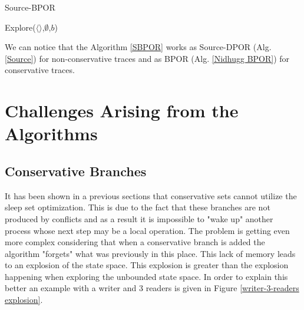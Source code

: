 \begin{algorithm}
    \caption{Source-BPOR}
    \label{SBPOR}
    Explore($\langle \rangle$,$\emptyset$,$b$)\;
\end{algorithm}

We can notice that the Algorithm \ref{SBPOR} works as Source-DPOR (Alg. \ref{Source}) for non-conservative traces and as BPOR (Alg. \ref{Nidhugg BPOR}) for conservative traces.

\section{Challenges Arising from the Algorithms}

\subsection{Conservative Branches}
It has been shown in a previous sections that conservative sets cannot utilize the sleep set optimization. This is due to the fact that these branches are not produced by conflicts
and as a result it is impossible to "wake up" another process whose next step may be a local operation. The problem is getting even more complex considering that when a conservative branch
is added the algorithm "forgets" what was previously in this place. This lack of memory leads to an explosion of the state space. This explosion is greater than
the explosion happening when exploring the unbounded state space. 
In order to explain this better an example with a writer and 3 readers is given in Figure \ref{writer-3-readers explosion}.

